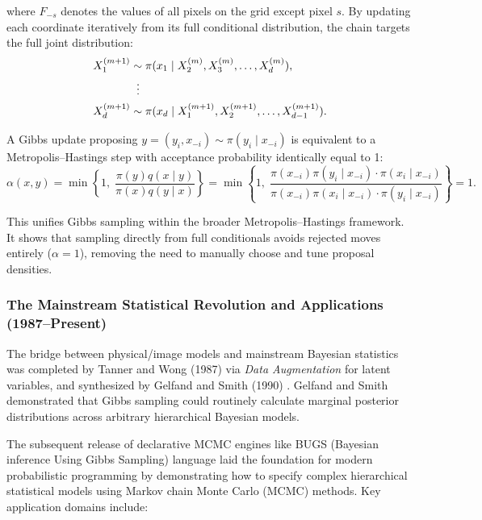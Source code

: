 where $F_{-s}$ denotes the values of all pixels on the grid except pixel $s$. By updating each coordinate iteratively from its full conditional distribution, the chain targets the full joint distribution:
\begin{align}
    X_1^{(m+1)} &\sim \pi(x_1 \mid X_2^{(m)}, X_3^{(m)}, \dots, X_d^{(m)}), \\
    &\;\;\vdots \notag \\
    X_d^{(m+1)} &\sim \pi(x_d \mid X_1^{(m+1)}, X_2^{(m+1)}, \dots, X_{d-1}^{(m+1)}).
\end{align}


\begin{proposition}
\label{prop:gibbs-as-mh}
A Gibbs update proposing $y = (y_i, x_{-i}) \sim \pi(y_i \mid x_{-i})$ is equivalent to a Metropolis--Hastings step with acceptance probability identically equal to 1:
\begin{equation}
    \alpha(x,y) = \min\left\{1, \; \frac{\pi(y) q(x \mid y)}{\pi(x) q(y \mid x)}\right\} = \min\left\{1, \; \frac{\pi(x_{-i})\pi(y_i \mid x_{-i}) \cdot \pi(x_i \mid x_{-i})}{\pi(x_{-i})\pi(x_i \mid x_{-i}) \cdot \pi(y_i \mid x_{-i})}\right\} = 1.
\end{equation}
\end{proposition}
\noindent This unifies Gibbs sampling within the broader Metropolis--Hastings framework. It shows that sampling directly from full conditionals avoids rejected moves entirely ($\alpha = 1$), removing the need to manually choose and tune proposal densities.

\subsubsection{The Mainstream Statistical Revolution and Applications (1987--Present)}
\label{subsec:mcmc-applications}

The bridge between physical/image models and mainstream Bayesian statistics was completed by Tanner and Wong (1987) \cite{tannerwong1987} via \emph{Data Augmentation} for latent variables, and synthesized by Gelfand and Smith (1990) \cite{gelfandsmith1990}. Gelfand and Smith demonstrated that Gibbs sampling could routinely calculate marginal posterior distributions across arbitrary hierarchical Bayesian models.

The subsequent release of declarative MCMC engines like BUGS (Bayesian inference Using Gibbs Sampling) language \cite{gilks1994} laid the foundation for modern probabilistic programming by demonstrating how to specify complex hierarchical statistical models using Markov chain Monte Carlo (MCMC) methods. Key application domains include:

